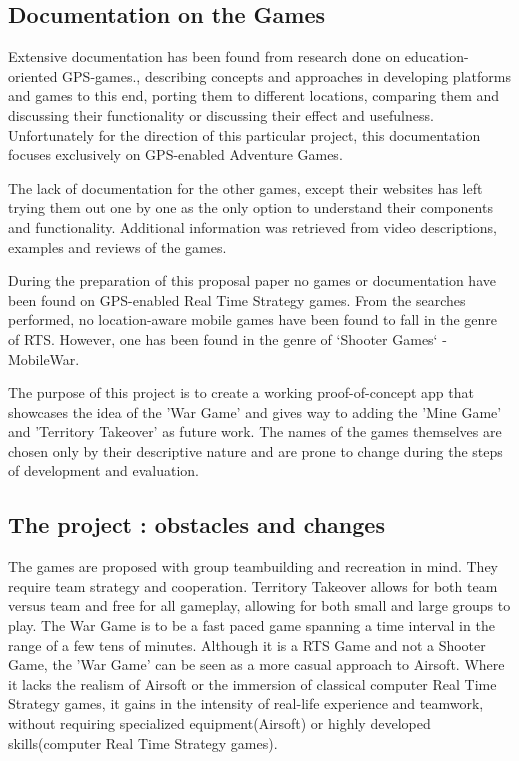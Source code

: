 \documentclass{article}
\begin{document}
\subsection{Documentation on the Games}
Extensive documentation has been found from research done on education-oriented
GPS-games.\cite{pbarg1}\cite{pbarg2}\cite{pbarg3}\cite{pbarg4}\cite{pbarg5}\cite{pbarg6},
describing concepts and approaches in developing platforms and games to this
end\cite{pbarg3}, porting them to different locations\cite{pbarg4}, comparing
them and discussing their functionality\cite{pbarg6}\cite{pbarg1}\cite{pbarg2}
or discussing their effect and usefulness\cite{pbarg1}. Unfortunately for the
direction of this particular project, this documentation focuses exclusively on
GPS-enabled Adventure Games.\newline

The lack of documentation for the other games, except their websites has left
trying them out one by one as the only option to understand their components and
functionality. Additional information was retrieved from video descriptions,
examples and reviews of the games.\newline

During the preparation of this proposal paper no games or documentation have
been found on GPS-enabled Real Time Strategy games. From the searches performed,
no location-aware mobile games have been found to fall in the genre of RTS.
However, one has been found in the genre of `Shooter Games` - MobileWar.\newline

The purpose of this project is to create a working proof-of-concept app
that showcases the idea of the 'War Game' and gives way to adding the 'Mine
Game' and 'Territory Takeover' as future work. The names of the games themselves
are chosen only by their descriptive nature and are prone to change during the
steps of development and evaluation.

\subsection{The project : obstacles and changes}
The games are proposed with group teambuilding and recreation in mind. They
require team strategy and cooperation. Territory Takeover allows for both team
versus team and free for all gameplay, allowing for both small and large groups
to play. The War Game is to be a fast paced game spanning a time interval in the
range of a few tens of minutes. Although it is a RTS Game and not a Shooter
Game, the 'War Game' can be seen as a more casual approach to Airsoft.
Where it lacks the realism of Airsoft or the immersion of classical computer
Real Time Strategy games, it gains in the intensity of real-life experience and
teamwork, without requiring specialized equipment(Airsoft) or highly developed
skills(computer Real Time Strategy games).
\end{document}
